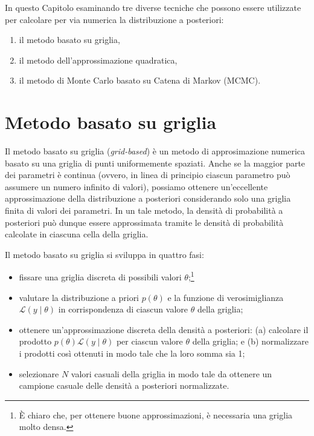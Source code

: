 \documentclass[
  10pt,
  italian,
  a4paper,
  extrafontsizes,onecolumn,openright
  ]{memoir}
\providecommand{\tightlist}{%
  \setlength{\itemsep}{0pt}\setlength{\parskip}{0pt}}
\begin{document}
In questo Capitolo esaminando tre diverse tecniche che possono essere utilizzate per calcolare per via numerica la distribuzione a posteriori:

\begin{enumerate}
\def\labelenumi{\arabic{enumi}.}
\tightlist
\item
  il metodo basato su griglia,
\item
  il metodo dell'approssimazione quadratica,
\item
  il metodo di Monte Carlo basato su Catena di Markov (MCMC).
\end{enumerate}

\hypertarget{metodo-basato-su-griglia}{%
\section{Metodo basato su griglia}\label{metodo-basato-su-griglia}}

Il metodo basato su griglia (\emph{grid-based}) è un metodo di approsimazione numerica basato su una griglia di punti uniformemente spaziati. Anche se la maggior parte dei parametri è continua (ovvero, in linea di principio ciascun parametro può assumere un numero infinito di valori), possiamo ottenere un'eccellente approssimazione della distribuzione a posteriori considerando solo una griglia finita di valori dei parametri. In un tale metodo, la densità di probabilità a posteriori può dunque essere approssimata tramite le densità di probabilità calcolate in ciascuna cella della griglia.

Il metodo basato su griglia si sviluppa in quattro fasi:

\begin{itemize}
\tightlist
\item
  fissare una griglia discreta di possibili valori \(\theta\);\footnote{È chiaro che, per ottenere buone approssimazioni, è necessaria una griglia molto densa.}
\item
  valutare la distribuzione a priori \(p(\theta)\) e la funzione di verosimiglianza \(\mathcal{L}(y \mid \theta)\) in corrispondenza di ciascun valore \(\theta\) della griglia;
\item
  ottenere un'approssimazione discreta della densità a posteriori: (a) calcolare il prodotto \(p(\theta) \mathcal{L} (y \mid \theta)\) per ciascun
  valore \(\theta\) della griglia; e (b) normalizzare i prodotti così ottenuti in modo tale che la loro somma sia 1;
\item
  selezionare \(N\) valori casuali della griglia in modo tale da ottenere un campione casuale delle densità a posteriori normalizzate.
\end{itemize}
\end{document}
